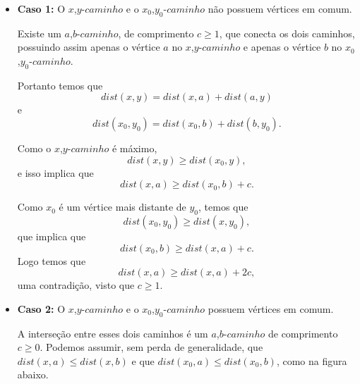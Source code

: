 \documentclass[a4paper,12pt]{article}
\begin{document}
	\begin{itemize}
        \item \textbf{Caso 1:} O $x$,$y$-$caminho$ e o 
        $x_0$,$y_0$-$caminho$ não possuem vértices em comum.

        Existe um $a$,$b$-$caminho$, de 
        comprimento $c \ge 1$, que conecta os dois caminhos, 
        possuindo assim apenas o vértice $a$ no 
        $x$,$y$-$caminho$ e apenas o vértice $b$ no
        $x_0$,$y_0$-$caminho$.

        \begin{center}  \end{center}


        Portanto temos que
        $$ dist(x,y) = dist(x,a) + dist(a,y) $$ e
        $$ dist(x_0,y_0) = dist(x_0,b) + dist(b,y_0).$$

        Como o $x$,$y$-$caminho$ é máximo, 
        $$ dist(x,y)\ge dist(x_0,y),$$
        e isso implica que
        $$ dist(x,a)\ge dist(x_0,b)+c.$$

        Como $x_0$ é um vértice mais distante de $y_0$, temos que 
        $$ dist(x_0,y_0)\ge dist(x,y_0),$$ que implica que
        $$ dist(x_0,b)\ge dist(x,a)+c. $$ 
        Logo temos que
        $$ dist(x,a)\ge dist(x, a)+2c,$$
        uma contradição, visto que
		$c\ge 1$.


		\bigskip
		\bigskip
		\bigskip


		\item \textbf{Caso 2:} O $x$,$y$-$caminho$ e o 
		$x_0$,$y_0$-$caminho$ possuem vértices em comum.

		A interseção entre esses dois caminhos é um 
		$a$,$b$-$caminho$ de comprimento $c \ge 0$.
		Podemos assumir, sem perda de generalidade, que
		$dist(x,a) \le dist(x,b)$ e que
		$dist(x_0,a) \le dist(x_0,b)$, como na figura abaixo.





\end{itemize}
\end{document}
